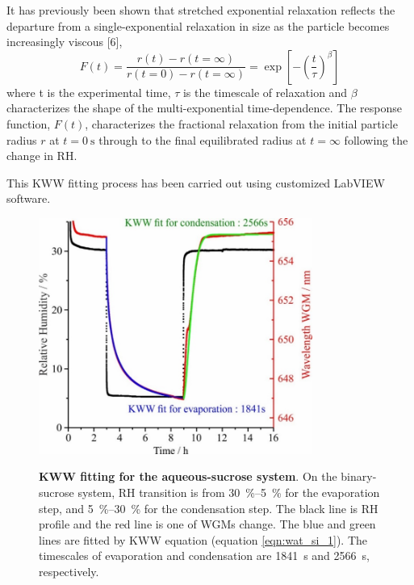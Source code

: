 It has previously been shown that stretched exponential relaxation reflects the departure from a single-exponential relaxation in size as the particle becomes increasingly viscous [6],
\begin{equation}\label{eqn:wat_si_1}
F(t)=\frac{r(t)-r(t=\infty)}{r(t=0)-r(t=\infty)}=\exp \left[-\left(\frac{t}{\tau}\right)^{\beta}\right]
\end{equation}
where t is the experimental time, $\tau$ is the timescale of relaxation and $\beta$ characterizes the shape of the multi-exponential time-dependence. The response function, $F(t)$, characterizes the fractional relaxation from the initial particle radius $r$ at $t=\SI{0}{\second}$ through to the final equilibrated radius at $t=\infty$ following the change in RH.

This KWW fitting process has been carried out using customized LabVIEW software.

\begin{figure}
    \centering
    \caption{\textbf{KWW fitting for the aqueous-sucrose system}. On the binary-sucrose system, RH transition is from \SIrange{30}{5}{\percent} for the evaporation step, and \SIrange{5}{30}{\percent} for the condensation step. The black line is RH profile and the red line is one of WGMs change. The blue and green lines are fitted by KWW equation (equation \ref{eqn:wat_si_1}). The timescales of evaporation and condensation are \SI{1841}{\second} and \SI{2566}{\second}, respectively.}
    \includegraphics[width=0.8\textwidth]{chapters/water_hopping/figures/image003.jpg}
    \label{fig:wat_s1}
\end{figure}

